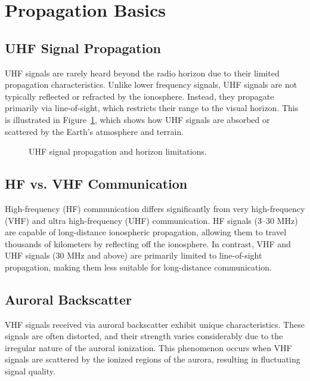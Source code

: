 \section{Propagation Basics}
\label{section:propagation_basics}

\subsection*{UHF Signal Propagation}
UHF signals are rarely heard beyond the radio horizon due to their limited propagation characteristics. Unlike lower frequency signals, UHF signals are not typically reflected or refracted by the ionosphere. Instead, they propagate primarily via line-of-sight, which restricts their range to the visual horizon. This is illustrated in Figure~\ref{fig:uhf_propagation}, which shows how UHF signals are absorbed or scattered by the Earth's atmosphere and terrain.

\begin{figure}[h!]
    \centering
    \caption{UHF signal propagation and horizon limitations.}
    \label{fig:uhf_propagation}
\end{figure}

\subsection*{HF vs. VHF Communication}
High-frequency (HF) communication differs significantly from very high-frequency (VHF) and ultra high-frequency (UHF) communication. HF signals (3–30 MHz) are capable of long-distance ionospheric propagation, allowing them to travel thousands of kilometers by reflecting off the ionosphere. In contrast, VHF and UHF signals (30 MHz and above) are primarily limited to line-of-sight propagation, making them less suitable for long-distance communication.

\subsection*{Auroral Backscatter}
VHF signals received via auroral backscatter exhibit unique characteristics. These signals are often distorted, and their strength varies considerably due to the irregular nature of the auroral ionization. This phenomenon occurs when VHF signals are scattered by the ionized regions of the aurora, resulting in fluctuating signal quality.


